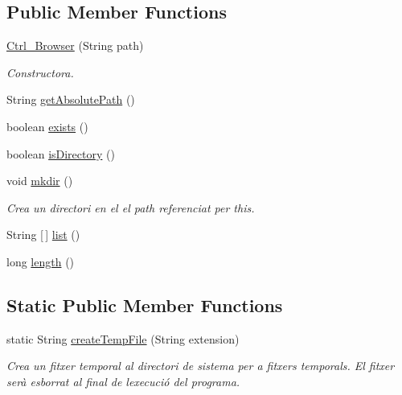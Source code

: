 \subsection*{Public Member Functions}
\begin{DoxyCompactItemize}
\item 
\hyperlink{classpersistencia_1_1browser_1_1Ctrl__Browser_a6cd8687a9748fc4c169d1d72be7081b1}{Ctrl\+\_\+\+Browser} (String path)
\begin{DoxyCompactList}\small\item\em Constructora. \end{DoxyCompactList}\item 
String \hyperlink{classpersistencia_1_1browser_1_1Ctrl__Browser_abdabfef6639c93ac5dc64f569b5b1d36}{get\+Absolute\+Path} ()
\item 
boolean \hyperlink{classpersistencia_1_1browser_1_1Ctrl__Browser_ac79782a4f7fd5207498fe37e952f9b8b}{exists} ()
\item 
boolean \hyperlink{classpersistencia_1_1browser_1_1Ctrl__Browser_abdf13ea9a8d928b1efc6f3a69e18f6c6}{is\+Directory} ()
\item 
void \hyperlink{classpersistencia_1_1browser_1_1Ctrl__Browser_a947773ee38a780bae338aa0e4f396f6f}{mkdir} ()
\begin{DoxyCompactList}\small\item\em Crea un directori en el el path referenciat per this. \end{DoxyCompactList}\item 
String \mbox{[}$\,$\mbox{]} \hyperlink{classpersistencia_1_1browser_1_1Ctrl__Browser_abbf52c645a931fb8e5f727c2c99af97a}{list} ()
\item 
long \hyperlink{classpersistencia_1_1browser_1_1Ctrl__Browser_a22b50558c4e066fe0e486def502bd30d}{length} ()
\end{DoxyCompactItemize}
\subsection*{Static Public Member Functions}
\begin{DoxyCompactItemize}
\item 
static String \hyperlink{classpersistencia_1_1browser_1_1Ctrl__Browser_ad64712e539747815fb590a7adfaf5517}{create\+Temp\+File} (String extension)
\begin{DoxyCompactList}\small\item\em Crea un fitxer temporal al directori de sistema per a fitxers temporals. El fitxer serà esborrat al final de l\textquotesingle{}execució del programa. \end{DoxyCompactList}\end{DoxyCompactItemize}
